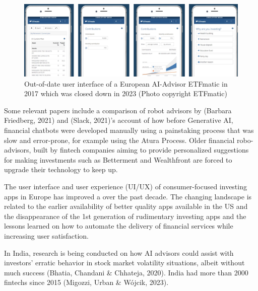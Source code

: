 \documentclass[
  letterpaper,
  DIV=11,
  numbers=noendperiod]{scrartcl}
\begin{document}
\begin{figure}[H]

{\centering \includegraphics[width=1\linewidth,height=\textheight,keepaspectratio]{./images/ai/etfmatic.png}

}

\caption{Out-of-date user interface of a European AI-Advisor ETFmatic in
2017 which was closed down in 2023 (Photo copyright ETFmatic)}

\end{figure}%

Some relevant papers include a comparison of robot advisors by (Barbara
Friedberg, 2021) and (Slack, 2021)'s account of how before Generative
AI, financial chatbots were developed manually using a painstaking
process that was slow and error-prone, for example using the Atura
Process. Older financial robo-advisors, built by fintech companies
aiming to provide personalized suggestions for making investments such
as Betterment and Wealthfront are forced to upgrade their technology to
keep up.

The user interface and user experience (UI/UX) of consumer-focused
investing apps in Europe has improved a over the past decade. The
changing landscape is related to the earlier availability of better
quality apps available in the US and the disappearance of the 1st
generation of rudimentary investing apps and the lessons learned on how
to automate the delivery of financial services while increasing user
satisfaction.

In India, research is being conducted on how AI advisors could assist
with investors' erratic behavior in stock market volatility situations,
albeit without much success (Bhatia, Chandani \& Chhateja, 2020). India
had more than 2000 fintechs since 2015 (Migozzi, Urban \& Wójcik, 2023).
\end{document}
